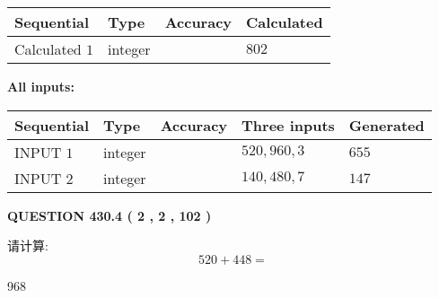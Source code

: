 \documentclass{ctexart}
\begin{document}
   
   
   
\noindent{}
   
   
  
  
\noindent\begin{tabular}{|l|l|l|l|}
\hline
 Sequential & Type & Accuracy & Calculated \\ 
\hline
 
 
  Calculated $  1 $ & integer &  & 
  $ 802 $ 
 \\  \hline  
 \end{tabular}
   
   
   
   
\noindent\vspace{0.1in}\hspace{-0.08in} {\textbf{\Large{All inputs: }}}
   
   
  
  
\noindent\begin{tabular}{|l|l|l|l|l|}
\hline
 Sequential & Type & Accuracy & Three inputs & Generated \\ 
\hline
 
 
  INPUT $  1 $ & integer &  & $
 520
 , 
 960
 , 
 3
 $ & $ 655 $ 
 \\  \hline  
 
 
  INPUT $  2 $ & integer &  & $
 140
 , 
 480
 , 
 7
 $ & $ 147 $ 
 \\  \hline  
 \end{tabular}
   
   
  
\vspace{0.2in}
  
{\textbf{\Large{QUESTION
430.4 
 ( 2 , 2 , 102 )
}}}
  
  
 
请计算:
\begin{equation}
520 +  %
448 = \nonumber
\end{equation}
 
 
 
\noindent{}
 
 

968
 
 
\noindent{}
 
 

 
 
 
\noindent{}
 
\end{document}
